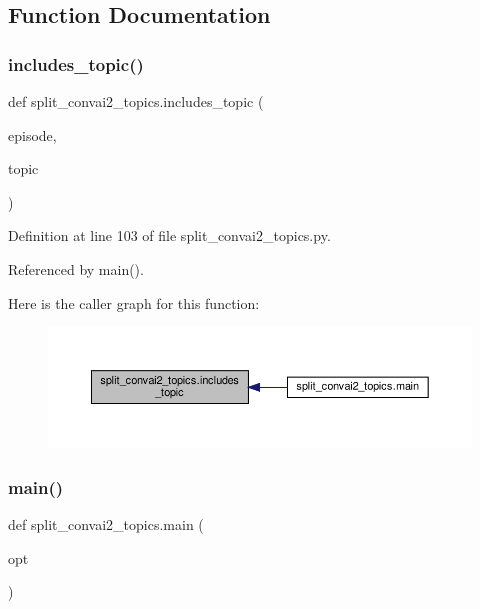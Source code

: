 \subsection{Function Documentation}
\mbox{\label{namespacesplit__convai2__topics_a141f246ea2a420cf68009cb02b0fe41d}} 
\subsubsection{\texorpdfstring{includes\+\_\+topic()}{includes\_topic()}}
{\footnotesize\ttfamily def split\+\_\+convai2\+\_\+topics.\+includes\+\_\+topic (\begin{DoxyParamCaption}\item[{}]{episode,  }\item[{}]{topic }\end{DoxyParamCaption})}



Definition at line 103 of file split\+\_\+convai2\+\_\+topics.\+py.



Referenced by main().

Here is the caller graph for this function\+:
\nopagebreak
\begin{figure}[H]
\begin{center}
\leavevmode
\includegraphics[width=350pt]{namespacesplit__convai2__topics_a141f246ea2a420cf68009cb02b0fe41d_icgraph}
\end{center}
\end{figure}
\mbox{\label{namespacesplit__convai2__topics_a4477eb52fdcb7e5f0da1639ecd493130}} 
\subsubsection{\texorpdfstring{main()}{main()}}
{\footnotesize\ttfamily def split\+\_\+convai2\+\_\+topics.\+main (\begin{DoxyParamCaption}\item[{}]{opt }\end{DoxyParamCaption})}

